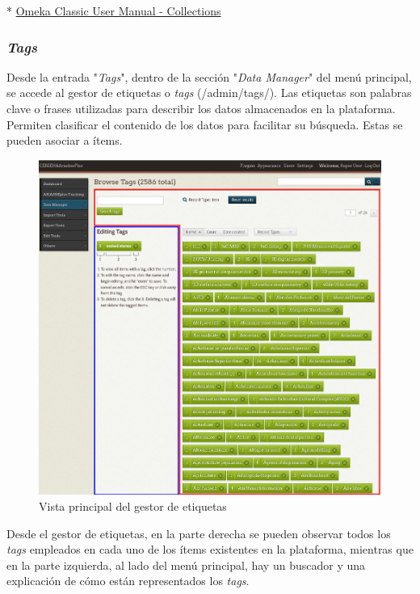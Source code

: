 \documentclass[
]{article}
\begin{document}
* \href{https://omeka.org/classic/docs/Content/Collections/}{Omeka
Classic User Manual - Collections}

\hypertarget{tags}{%
\subsubsection{\texorpdfstring{\emph{Tags}}{Tags}}\label{tags}}

Desde la entrada "\emph{Tags}", dentro de la sección "\emph{Data
Manager}" del menú principal, se accede al gestor de etiquetas o
\emph{tags} ({/admin/tags/}). Las etiquetas son palabras clave o frases
utilizadas para describir los datos almacenados en la plataforma.
Permiten clasificar el contenido de los datos para facilitar su
búsqueda. Estas se pueden asociar a ítems.

\begin{figure}
\hypertarget{tags-view}{%
\centering
\includegraphics{../_static/images/tags-view.png}
\caption{Vista principal del gestor de etiquetas}\label{tags-view}
}
\end{figure}

Desde el gestor de etiquetas, en la parte derecha se pueden observar
todos los \emph{tags} empleados en cada uno de los ítems existentes en
la plataforma, mientras que en la parte izquierda, al lado del menú
principal, hay un buscador y una explicación de cómo están representados
los \emph{tags}.
\end{document}
